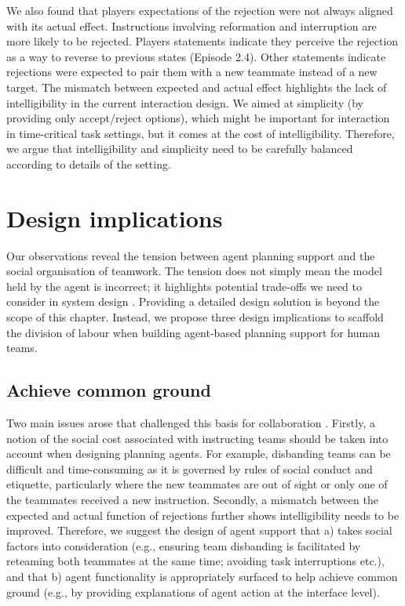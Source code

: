 We also found that players expectations of the rejection were not always aligned with its actual effect. Instructions involving reformation and interruption are more likely to be rejected. Players statements indicate they perceive the rejection as a way to reverse to previous states (Episode 2.4). Other statements indicate rejections were expected to pair them with a new teammate instead of a new target. The mismatch between expected and actual effect highlights the lack of intelligibility in the current interaction design. We aimed at simplicity (by providing only accept/reject options), which might be important for interaction in time-critical task settings, but it comes at the cost of intelligibility. Therefore, we argue that intelligibility and simplicity need to be carefully balanced according to details of the setting.\\


\section{Design implications}

Our observations reveal the tension between agent planning support and the social organisation of teamwork. The tension does not simply mean the model held by the agent is incorrect; it highlights potential trade-offs we need to consider in system design \cite{Bowers1994,Sukthankar}. Providing a detailed design solution is beyond the scope of this chapter. Instead, we propose three design implications to scaffold the division of labour when building agent-based planning support for human teams.\\

\subsection{Achieve common ground}  
Two main issues arose that challenged this basis for collaboration \cite{Bradshaw2011}. Firstly, a notion of the social cost associated with instructing teams should be taken into account when designing planning agents. For example, disbanding teams can be difficult and time-consuming as it is governed by rules of social conduct and etiquette, particularly where the new teammates are out of sight or only one of the teammates received a new instruction. Secondly, a mismatch between the expected and actual function of rejections further shows intelligibility needs to be improved. Therefore, we suggest the design of agent support that a) takes social factors into consideration (e.g., ensuring team disbanding is facilitated by reteaming both teammates at the same time; avoiding task interruptions etc.), and that b) agent functionality is appropriately surfaced to help achieve common ground (e.g., by providing explanations of agent action at the interface level).

